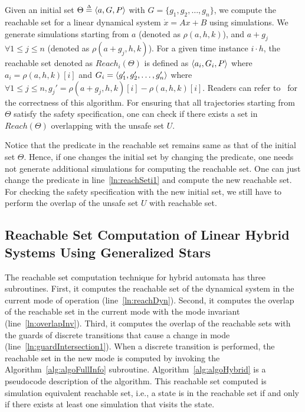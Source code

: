 Given an initial set $\Theta \deq \tup{a, G, P}$ with $G = \{g_1, g_2, \ldots, g_n\}$, we compute the reachable set for a linear dynamical system $\dot{x} = Ax + B$ using simulations.
%
We generate simulations starting from $a$ (denoted as $\rho(a, h, k)$), and $a+g_j$ $\forall 1\leq j \leq n$ (denoted as $\rho(a+g_j, h, k)$). 
%
For a given time instance $i\cdot h$, the reachable set denoted as $Reach_i(\Theta)$ is defined as $\tup{a_i, G_i, P}$ where $a_i = \rho(a, h, k)[i]$ and $G_i = \tup{g_1', g_2', \ldots, g_n'}$ where $\forall 1\leq j \leq n, g_j' = \rho(a+g_j, h, k)[i] - \rho(a, h, k)[i]$. 
%
Readers can refer to~\cite{bak2017tacas} for the correctness of this algorithm.
%
For ensuring that all trajectories starting from $\Theta$ satisfy the safety specification, one can check if there exists a set in $Reach(\Theta)$ overlapping with the unsafe set $U$.
%

\begin{remark}
\label{rem:predConst}
Notice that the predicate in the reachable set remains same as that of the initial set $\Theta$. Hence, if one changes the initial set by changing the predicate, one needs not generate additional simulations for computing the reachable set. One can just change the predicate in line~\ref{ln:reachSeti1} and compute the new reachable set. For checking the safety specification with the new initial set, we still have to perform the overlap of the unsafe set $U$ with reachable set.
\end{remark}

\subsection{Reachable Set Computation of Linear Hybrid Systems Using Generalized Stars}
%
The reachable set computation technique for hybrid automata has three subroutines.
%
First, it computes the reachable set of the dynamical system in the current mode of operation (line~\ref{ln:reachDyn}).
%
Second, it computes the overlap of the reachable set in the current mode with the mode invariant (line~\ref{ln:overlapInv}).
%
Third, it computes the overlap of the reachable sets with the guards of discrete transitions that cause a change in mode (line~\ref{ln:guardIntersection1}).
%
When a discrete transition is performed, the reachable set in the new mode is computed by invoking the Algorithm~\ref{alg:algoFullInfo} subroutine.
%
Algorithm~\ref{alg:algoHybrid} is a pseudocode description of the algorithm. This reachable set computed is simulation equivalent reachable set, i.e., a state is in the reachable set if and only if there exists at least one simulation that visits the state.

